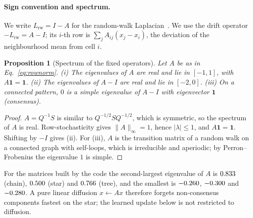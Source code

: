 \documentclass[10pt]{article}
\newtheorem{proposition}{Proposition}
\begin{document}
\paragraph{Sign convention and spectrum.} We write $L_{\text{rw}} = I - A$ for the random-walk Laplacian~\citep{chung1997spectral}. We use the drift operator $-L_{\text{rw}} = A - I$; its $i$-th row is $\sum_j A_{ij}(x_j - x_i)$, the deviation of the neighbourhood mean from cell $i$.
\begin{proposition}[Spectrum of the fixed operators]\label{prop:spectrum}
Let $A$ be as in Eq.~\eqref{eq:rownorm}. (i) The eigenvalues of $A$ are real and lie in $[-1,1]$, with $A\mathbf{1}=\mathbf{1}$. (ii) The eigenvalues of $A-I$ are real and lie in $[-2,0]$. (iii) On a connected pattern, $0$ is a simple eigenvalue of $A-I$ with eigenvector $\mathbf{1}$ (consensus).
\end{proposition}
\begin{proof}
$A = Q^{-1}S$ is similar to $Q^{-1/2} S Q^{-1/2}$, which is symmetric, so the spectrum of $A$ is real. Row-stochasticity gives $\|A\|_\infty = 1$, hence $|\lambda|\le 1$, and $A\mathbf{1}=\mathbf{1}$. Shifting by $-I$ gives (ii). For (iii), $A$ is the transition matrix of a random walk on a connected graph with self-loops, which is irreducible and aperiodic; by Perron--Frobenius the eigenvalue $1$ is simple.
\end{proof}
For the matrices built by the code the second-largest eigenvalue of $A$ is $0.833$ (chain), $0.500$ (star) and $0.766$ (tree), and the smallest is $-0.260$, $-0.300$ and $-0.280$. A pure linear diffusion $x \leftarrow A x$ therefore forgets non-consensus components fastest on the star; the learned update below is not restricted to diffusion.
\end{document}
